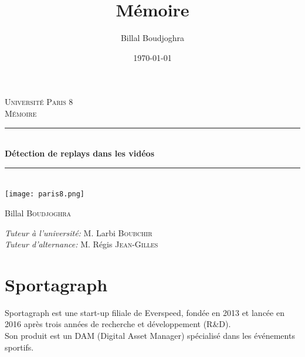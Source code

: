 \documentclass[11pt]{article}
\author{Billal Boudjoghra}
\date{\today}
\title{Mémoire}
\newcommand{\HRule}{\rule{\linewidth}{0.5mm}}
\begin{document}
\renewcommand{\contentsname}{Table des Matières}
\begin{titlepage}
  \begin{center}

    \textsc{\LARGE Université Paris 8}\\[2cm]

    \textsc{\Large Mémoire}\\[1.5cm]

    \HRule \\[0.4cm]
    { \huge \bfseries Détection de replays dans les vidéos\\[0.4cm] }

    \HRule \\[2cm]
    \texttt{[image: paris8.png]}
    \\[2cm]

    \begin{minipage}{0.4\textwidth}
      \begin{flushleft} \large
        Billal \textsc{Boudjoghra}
      \end{flushleft}
    \end{minipage}
    \begin{minipage}{0.34\textwidth}
      \begin{flushright} \large
        \emph{Tuteur à l'université:} M. Larbi \textsc{Boubchir}\\
        \emph{Tuteur d'alternance:} M. Régis \textsc{Jean-Gilles}
      \end{flushright}
    \end{minipage}

  \end{center}
\end{titlepage}
\tableofcontents

\newpage
\section{Sportagraph}
\label{sec:org62c3360}
Sportagraph est une start-up filiale de Everspeed, fondée en 2013 et lancée en 2016 après trois années de recherche et développement (R\&D).\\
Son produit est un DAM (Digital Asset Manager) spécialisé dans les événements sportifs.\\
\end{document}
